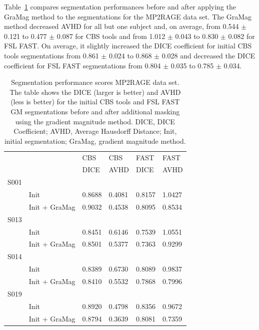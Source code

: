 Table~\ref{tab:table2} compares segmentation performances before and after applying the GraMag method to the segmentations for the MP2RAGE data set. The GraMag method decreased AVHD for all but one subject and, on average, from 0.544 $\pm$ 0.121 to 0.477 $\pm$ 0.087 for CBS tools and from 1.012 $\pm$ 0.043 to 0.830 $\pm$ 0.082 for FSL FAST. On average, it slightly increased the DICE coefficient for initial CBS tools segmentations from 0.861 $\pm$ 0.024 to 0.868 $\pm$ 0.028 and decreased the DICE coefficient for FSL FAST segmentations from 0.804 $\pm$ 0.035 to 0.785 $\pm$ 0.034.

\begin{table}[!ht]
\centering
\caption{
Segmentation performance scores MP2RAGE data set. The table shows the DICE (larger is better) and AVHD (less is better) for the initial CBS tools and FSL FAST GM segmentations before and after additional masking using the gradient magnitude method. DICE, DICE Coefficient; AVHD, Average Hausdorff Distance; Init, initial segmentation; GraMag, gradient magnitude method.}
\begin{tabular}{llllll}
\\
\toprule
     &                 & CBS   & CBS   & FAST  & FAST  \\
     &                 & DICE  & AVHD  & DICE  & AVHD  \\
\midrule
 S001 &                &            &            &             &             \\
      & Init           & 0.8688     & 0.4081     & 0.8157      & 1.0427      \\
      & Init + GraMag  & 0.9032     & 0.4538     & 0.8095      & 0.8534      \\
 S013 &                &            &            &             &             \\
      & Init           & 0.8451     & 0.6146     & 0.7539      & 1.0551      \\
      & Init + GraMag  & 0.8501     & 0.5377     & 0.7363      & 0.9299      \\
 S014 &                &            &            &             &             \\
      & Init           & 0.8389     & 0.6730     & 0.8089      & 0.9837      \\
      & Init + GraMag  & 0.8410     & 0.5532     & 0.7868      & 0.7996      \\
 S019 &                &            &            &             &             \\
      & Init           & 0.8920     & 0.4798     & 0.8356      & 0.9672      \\
      & Init + GraMag  & 0.8794     & 0.3639     & 0.8081      & 0.7359      \\
\bottomrule
\end{tabular}
\label{tab:table2}
\end{table}

